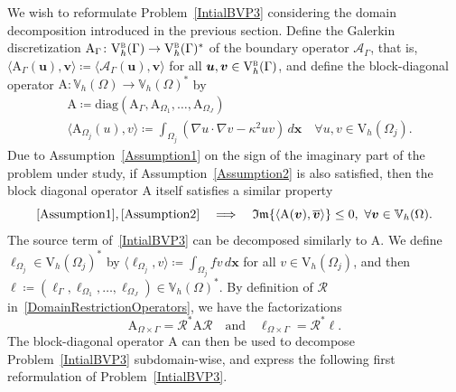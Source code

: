 \documentclass[a4paper,11pt]{article}
\newcommand{\mrm}{\mathrm}
\newcommand{\mA}{\mathrm{A}}
\newcommand{\mbV}{\mathbb{V}}
\newcommand{\Vh}{\mathrm{V}_{h}}
\newcommand{\bell}{\boldsymbol{\ell}}
\newcommand{\bx}{\boldsymbol{x}}
\newcommand{\bu}{\boldsymbol{u}}
\newcommand{\bv}{\boldsymbol{v}}
\renewcommand{\Im}{\mathfrak{Im}} %
\begin{document}
We wish to reformulate Problem~\eqref{IntialBVP3} considering the domain decomposition introduced in the previous section. Define the Galerkin discretization
$\mA_{\Gamma}\colon \Vh^{\textsc{b}}(\Gamma) \to \Vh^{\textsc{b}}(\Gamma)^*$
of the boundary operator $\mathcal{A}_{\Gamma}$, that is, $\langle \mA_{\Gamma}(\bu),\bv\rangle\coloneq
\langle \mathcal{A}_{\Gamma}(\bu),\bv\rangle$ for all $\bu,\bv\in
\Vh^{\textsc{b}}(\Gamma)$, and define the block-diagonal operator
$\mA\colon \mbV_h(\Omega)\to \mbV_h(\Omega)^*$ by
\begin{equation*}
  \begin{aligned}
    & \mA\coloneq \mrm{diag}(\mA_{\Gamma},\mA_{\Omega_1},\dots,\mA_{\Omega_J})\\
    & \langle \mA_{\Omega_j}(u),v\rangle\coloneq\int_{\Omega_j}(\nabla u\cdot\nabla v - \kappa^{2}u v)\,d\bx
    \quad \forall u,v\in \Vh(\Omega_j).
  \end{aligned}
\end{equation*}
Due to Assumption~\eqref{Assumption1} on the sign of the imaginary part of the problem under study,
if Assumption~\eqref{Assumption2} is also satisfied, then the block diagonal operator
$\mA$ itself satisfies a similar property
\begin{equation}\label{Assumption3}
  \eqref{Assumption1}, \eqref{Assumption2}\quad\Longrightarrow\quad \Im\{\langle
  \mA(\bv),\overline{\bv}\rangle\}\leq 0,\ \forall \bv\in
  \mbV_h(\Omega).
\end{equation}
The source term of~\eqref{IntialBVP3} can be decomposed similarly to \(\mA\). We
define $\ell_{\Omega_j}\in \Vh(\Omega_j)^*$ by $\langle
\ell_{\Omega_j}, v\rangle\coloneq\int_{\Omega_j}f v\,d\bx$ for all $v \in \Vh(\Omega_j)$, and then
$\bell\coloneq(\ell_{\Gamma},\ell_{\Omega_1},\dots,\ell_{\Omega_J})\in
\mbV_h(\Omega)^*$. 
By definition of $\mathcal{R}$ in~\eqref{DomainRestrictionOperators}, we have the factorizations 
\begin{equation}\label{DecompositionMainOperator}
  \mA_{\Omega\times\Gamma} = \mathcal{R}^{*}\mA\mathcal{R}
  \quad\text{and}\quad
  \ell_{\Omega\times\Gamma} = \mathcal{R}^{*}\boldsymbol{\ell}.
\end{equation}
The block-diagonal operator $\mA$ can then be used to decompose Problem~\eqref{IntialBVP3} subdomain-wise, and express the following first reformulation of Problem~\eqref{IntialBVP3}.
\end{document}

